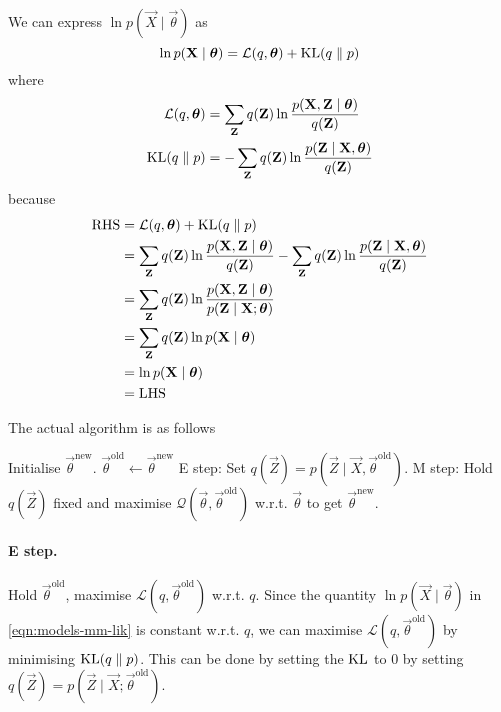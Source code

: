 We can express $\ln p(\vec X \mid \vec \theta)$ as
\begin{equation}
    \ln p(\boldsymbol{\mathbf{X}} \mid \boldsymbol{\mathbf{\theta}}) = \mathcal L(q, \boldsymbol{\mathbf{\theta}}) + \operatorname{KL}(q \parallel p) \label{eqn:models-mm-lik}
\end{equation}
where
\begin{align}
    \mathcal L(q, \boldsymbol{\mathbf{\theta}})  &= \sum_{\boldsymbol{\mathbf{Z}}} q(\boldsymbol{\mathbf{Z}}) \ln \frac{p(\boldsymbol{\mathbf{X}}, \boldsymbol{\mathbf{Z}} \mid \boldsymbol{\mathbf{\theta}})}{q(\boldsymbol{\mathbf{Z}})} \\
    \operatorname{KL}(q \parallel p)          &= -\sum_{\boldsymbol{\mathbf{Z}}} q(\boldsymbol{\mathbf{Z}}) \ln \frac{p(\boldsymbol{\mathbf{Z}} \mid \boldsymbol{\mathbf{X}}, \boldsymbol{\mathbf{\theta}})}{q(\boldsymbol{\mathbf{Z}})}
\end{align}
because
\begin{align*}
    \text{RHS}  &= \mathcal L(q, \boldsymbol{\mathbf{\theta}}) + \operatorname{KL}(q \parallel p)\\
                &= \sum_{\boldsymbol{\mathbf{Z}}} q(\boldsymbol{\mathbf{Z}}) \ln \frac{p(\boldsymbol{\mathbf{X}}, \boldsymbol{\mathbf{Z}} \mid \boldsymbol{\mathbf{\theta}})}{q(\boldsymbol{\mathbf{Z}})} - \sum_{\boldsymbol{\mathbf{Z}}} q(\boldsymbol{\mathbf{Z}}) \ln \frac{p(\boldsymbol{\mathbf{Z}} \mid \boldsymbol{\mathbf{X}}, \boldsymbol{\mathbf{\theta}})}{q(\boldsymbol{\mathbf{Z}})} \\
                &= \sum_{\boldsymbol{\mathbf{Z}}} q(\boldsymbol{\mathbf{Z}}) \ln \frac{p(\boldsymbol{\mathbf{X}}, \boldsymbol{\mathbf{Z}} \mid \boldsymbol{\mathbf{\theta}})}{p(\boldsymbol{\mathbf{Z}} \mid \boldsymbol{\mathbf{X}}; \boldsymbol{\mathbf{\theta}})} \\
                &= \sum_{\boldsymbol{\mathbf{Z}}} q(\boldsymbol{\mathbf{Z}}) \ln p(\boldsymbol{\mathbf{X}} \mid \boldsymbol{\mathbf{\theta}}) \\
                &= \ln p(\boldsymbol{\mathbf{X}} \mid \boldsymbol{\mathbf{\theta}}) \\
                &= \text{LHS}
\end{align*}

The actual algorithm is as follows
\begin{algorithmbis}[EM algorithm]\label{alg:em}
    \begin{algorithmic}[1]
        \State Initialise $\vec \theta^{\text{new}}$.
        \Repeat
            \State $\vec \theta^{\text{old}} \gets \vec \theta^{\text{new}}$
            \State E step: Set $q(\vec Z) = p\left(\vec Z \mid \vec X, \vec \theta^{\text{old}}\right)$.
            \State M step: Hold $q(\vec Z)$ fixed and maximise $\mathcal Q\left(\vec \theta, \vec \theta^{\text{old}}\right)$ w.r.t. $\vec \theta$ to get $\vec \theta^{\text{new}}$.
    \end{algorithmic}
\end{algorithmbis}

\paragraph{E step.} Hold $\vec \theta^{\text{old}}$, maximise $\mathcal L\left(q, \vec \theta^{\text{old}}\right)$ w.r.t. $q$. Since the quantity $\ln p(\vec X \mid \vec \theta)$ in \eqref{eqn:models-mm-lik} is constant w.r.t. $q$, we can maximise $\mathcal L\left(q, \vec \theta^{\text{old}}\right)$ by minimising $\operatorname{KL}(q \parallel p)$. This can be done by setting the $\operatorname{KL}$ to $0$ by setting $q(\vec Z) = p(\vec Z \mid \vec X; \vec \theta^{\text{old}})$.

